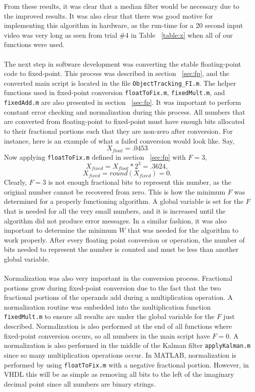\documentclass[12pt]{article} %
\begin{document}
\FloatBarrier
\noindent
From these results, it was clear that a median filter would be necessary due to the improved results. It was also clear that there was good motive for implementing this algorithm in hardware, as the run-time for a 20 second input video was very long as seen from trial \#4 in Table ~\ref{table:x} when all of our functions were used. \\\\
The next step in software development was converting the stable floating-point code to fixed-point. This process was described in section ~\ref{sec:fp}, and the converted main script is located in the file \texttt{ObjectTracking\_FI.m}. The helper functions used in fixed-point conversion \texttt{floatToFix.m}, \texttt{fixedMult.m}, and \texttt{fixedAdd.m} are also presented in section ~\ref{sec:fp}. It was important to perform constant error checking and normalization during this process. All numbers that are converted from floating-point to fixed-point must have enough bits allocated to their fractional portions such that they are non-zero after conversion. For instance, here is an example of what a failed conversion would look like. Say,
\[
X_{float} = .0453
\]
Now applying \texttt{floatToFix.m} defined in section ~\ref{sec:fp} with $F=3$, 
\[
X_{fixed} = X_{float} * 2^3 = .3624,
\]
\[
X_{fixed} = round(X_{fixed}) = 0.
\]
Clearly, $F=3$ is not enough fractional bits to represent this number, as the original number cannot be recovered from zero. This is how the minimum $F$ was determined for a properly functioning algorithm. A global variable is set for the $F$ that is needed for all the very small numbers, and it is increased until the algorithm did not produce error messages. In a similar fashion, it was also important to determine the minimum $W$ that was needed for the algorithm to work properly. After every floating point conversion or operation, the number of bits needed to represent the number is counted and must be less than another global variable. \\\\
Normalization was also very important in the conversion process. Fractional portions grow during fixed-point conversion due to the fact that the two fractional portions of the operands add during a multiplication operation. A normalization routine was embedded into the multiplication function \texttt{fixedMult.m} to ensure all results are under the global variable for the $F$ just described. Normalization is also performed at the end of all functions where fixed-point conversion occurs, so all numbers in the main script have $F=0$. A normalization is also performed in the middle of the Kalman filter \texttt{applyKalman.m} since so many multiplication operations occur. In MATLAB, normalization is performed by using \texttt{floatToFix.m} with a negative fractional portion. However, in VHDL this will be as simple as removing all bits to the left of the imaginary decimal point since all numbers are binary strings.\\\\
\end{document}
